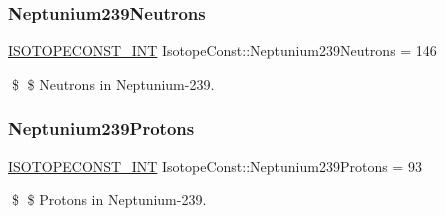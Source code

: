 \subsubsection{\texorpdfstring{Neptunium239\+Neutrons}{Neptunium239Neutrons}}
{\footnotesize\ttfamily \mbox{\hyperlink{group___isotope_const-_macros_ga5f18360b3e99483a35c32d789e62621c}{I\+S\+O\+T\+O\+P\+E\+C\+O\+N\+S\+T\+\_\+\+I\+NT}} Isotope\+Const\+::\+Neptunium239\+Neutrons = 146}

\$ \$ Neutrons in Neptunium-\/239. \mbox{\label{group___isotope_const-_neptunium-_np239_ga95e4abbe3ba5a8de8c46b5e04cc00386}} 
\subsubsection{\texorpdfstring{Neptunium239\+Protons}{Neptunium239Protons}}
{\footnotesize\ttfamily \mbox{\hyperlink{group___isotope_const-_macros_ga5f18360b3e99483a35c32d789e62621c}{I\+S\+O\+T\+O\+P\+E\+C\+O\+N\+S\+T\+\_\+\+I\+NT}} Isotope\+Const\+::\+Neptunium239\+Protons = 93}

\$ \$ Protons in Neptunium-\/239. 